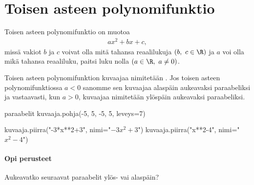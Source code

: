 \section{Toisen asteen polynomifunktio}


Toisen asteen polynomifunktio on muotoa
\begin{align*}
ax^2+bx+c,
\end{align*}
missä vakiot $b$ ja $c$ voivat olla mitä tahansa reaalilukuja $(b, \ c \in \R)$ ja $a$ voi olla mikä tahansa reaaliluku, paitsi luku nolla $(a \in \R, \ a \neq 0)$.

Toisen asteen polynomifunktion kuvaajaa nimitetään . Jos toisen asteen polynomifunktiossa $a < 0$ sanomme sen kuvaajaa
alaspäin aukeavaksi paraabeliksi ja vastaavasti, kun $a > 0$, kuvaajaa nimitetään ylöspäin aukeavaksi paraabeliksi.

\begin{luoKuva}{paraabelit}
	kuvaaja.pohja(-5, 5, -5, 5, leveys=7)
	
	kuvaaja.piirra("-3*x**2+3", nimi="$-3x^2+3$")
	kuvaaja.piirra("x**2-4", nimi="$x^2-4$")
\end{luoKuva}

\begin{center}
\end{center}

\begin{tehtavasivu}

\paragraph*{Opi perusteet}

\begin{tehtava}
  Aukeavatko seuraavat paraabelit ylös- vai alaspäin?
  \begin{alakohdat}
  \end{alakohdat}

  \begin{vastaus}
    \begin{alakohdat}
    \end{alakohdat}
  \end{vastaus}
\end{tehtava}

\end{tehtavasivu}